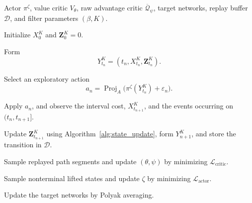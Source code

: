 \documentclass[11pt]{article}
\theoremstyle{remarkitalic}
\theoremstyle{remarkitalic}
\newcommand{\1}{\mathbf 1}
\begin{document}
\begin{algorithm}[H]
\caption{Hawkes CT-DDPG}
\label{alg:hawkes_ctddpg}
\begin{algorithmic}[1]

\Require Actor $\pi^\zeta$, value critic $V_\theta$, raw advantage
critic $\overline {\mathcal Q}_\psi$, target networks, replay buffer
$\mathcal D$, and filter parameters $(\beta,K)$.


    \State Initialize $X_0^K$ and $\mathbf Z_0^K=0$.


        \State Form
        \[
            Y_{t_n}^K
            =
            (t_n,X_{t_n}^K,\mathbf Z_{t_n}^K).
        \]

        \State Select an exploratory action
        \[
            a_n
            =
            \operatorname{Proj}_A
            \bigl(
                \pi^\zeta(Y_{t_n}^K)+\varepsilon_n
            \bigr).
        \]

        \State Apply $a_n$, and observe the interval cost,
        $X_{t_{n+1}}^K$, and the events occurring on
        $(t_n,t_{n+1}]$.

        \State Update $\mathbf Z_{t_{n+1}}^K$ using
        Algorithm~\ref{alg:state_update}, form $Y_{n+1}^K$, and
        store the transition in $\mathcal D$.

        \State Sample replayed path segments and update
        $(\theta,\psi)$ by minimizing
        $\mathcal L_{\mathrm{critic}}$.

        \State Sample nonterminal lifted states and update
        $\zeta$ by minimizing
        $\mathcal L_{\mathrm{actor}}$.

        \State Update the target networks by Polyak averaging.

    \EndFor

\EndFor

\end{algorithmic}
\end{algorithm}
\end{document}
